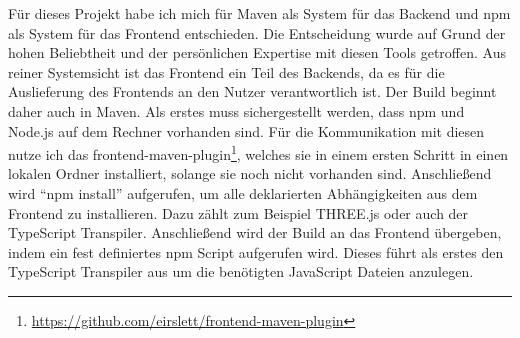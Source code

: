 Für dieses Projekt habe ich mich für Maven als System für das Backend und npm als System für das Frontend entschieden. Die Entscheidung wurde auf Grund der hohen Beliebtheit und der persönlichen Expertise mit diesen Tools getroffen. Aus reiner Systemsicht ist das Frontend ein Teil des Backends, da es für die Auslieferung des Frontends an den Nutzer verantwortlich ist. Der Build beginnt daher auch in Maven. Als erstes muss sichergestellt werden, dass npm und Node.js auf dem Rechner vorhanden sind. Für die Kommunikation mit diesen nutze ich das frontend-maven-plugin\footnote{\url{https://github.com/eirslett/frontend-maven-plugin}}, welches sie in einem ersten Schritt in einen lokalen Ordner installiert, solange sie noch nicht vorhanden sind. Anschließend wird “npm install” aufgerufen, um alle deklarierten Abhängigkeiten aus dem Frontend zu installieren. Dazu zählt zum Beispiel THREE.js oder auch der TypeScript Transpiler. Anschließend wird der Build an das Frontend übergeben, indem ein fest definiertes npm Script aufgerufen wird. Dieses führt als erstes den TypeScript Transpiler aus um die benötigten JavaScript Dateien anzulegen. 


